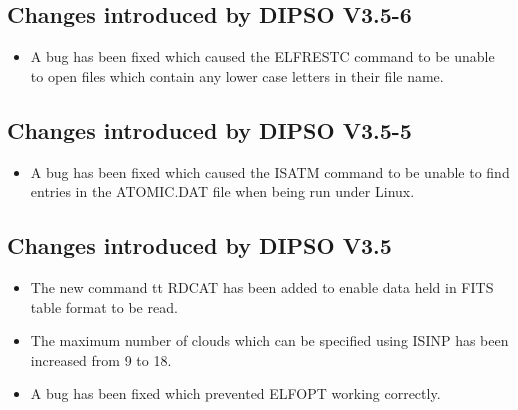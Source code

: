 \subsection{Changes introduced by DIPSO V3.5-6}
\begin{itemize}
\item A bug has been fixed which caused the ELFRESTC command to be unable to
open files which contain any lower case letters in their file name.
\end{itemize}

\subsection{Changes introduced by DIPSO V3.5-5}
\begin{itemize}
\item A bug has been fixed which caused the ISATM command to be unable to
find entries in the ATOMIC.DAT file when being run under Linux.
\end{itemize}

\subsection{Changes introduced by DIPSO V3.5}
\begin{itemize}
\item The new command {tt RDCAT} has been added to enable data held in FITS 
table format to be read.
\item The maximum number of clouds which can be specified using ISINP has
been increased from 9 to 18.
\item A bug has been fixed which prevented ELFOPT working correctly.
\end{itemize}

